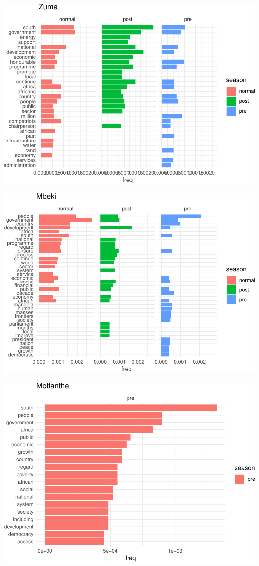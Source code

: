 \documentclass[]{article}
\begin{document}
\begin{center}\includegraphics{datasci_fi_Assignment_2_files/figure-latex/zuma -1} \end{center}

\begin{center}\includegraphics{datasci_fi_Assignment_2_files/figure-latex/mbeki -1} \end{center}

\begin{center}\includegraphics{datasci_fi_Assignment_2_files/figure-latex/Motlanthe -1} \end{center}
\end{document}
